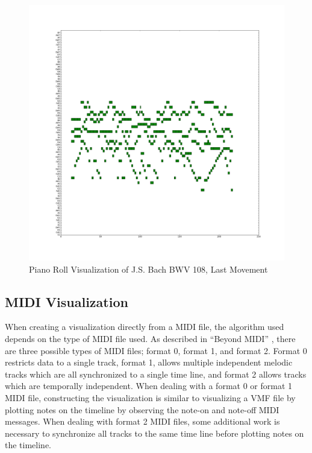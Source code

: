 \begin{figure}
  \begin{center}
    \includegraphics[scale=0.35]{resources/bwv108PianoRoll}
    \caption{Piano Roll Visualization of J.S. Bach BWV 108, Last Movement}
    \label{fig:bwv108PianoRoll}
  \end{center}
\end{figure}

\subsection{MIDI Visualization}

When creating a visualization directly from a MIDI file, the algorithm used depends on the type of MIDI file used. As described in ``Beyond MIDI'' \citep*{HeSe97}, there are three possible types of MIDI files; format 0, format 1, and format 2. Format 0 restricts data to a single track, format 1, allows multiple independent melodic tracks which are all synchronized to a single time line, and format 2 allows tracks which are temporally independent. When dealing with a format 0 or format 1 MIDI file, constructing the visualization is similar to visualizing a VMF file by plotting notes on the timeline by observing the note-on and note-off MIDI messages. When dealing with format 2 MIDI files, some additional work is necessary to synchronize all tracks to the same time line before plotting notes on the timeline.


